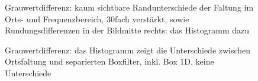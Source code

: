 \documentclass[a4paper,12pt]{article}
\begin{document}
\begin{figure}[htbp]
\caption{Grauwertdifferenz: kaum sichtbare Randunterschiede der Faltung im Orts-
und Frequenzbereich, 30fach verstärkt, sowie Rundungsdifferenzen in der Bildmitte
rechts: das Histogramm dazu}%
\label{figure_border_convolve}
\end{figure}

\begin{figure}[htbp]
\caption{Grauwertdifferenz: das Histogramm zeigt die Unterschiede zwischen
Ortsfaltung und separierten Boxfilter, inkl. Box 1D. keine Unterschiede}%
\label{figure_border_BoxSep}
\end{figure}
\end{document}
